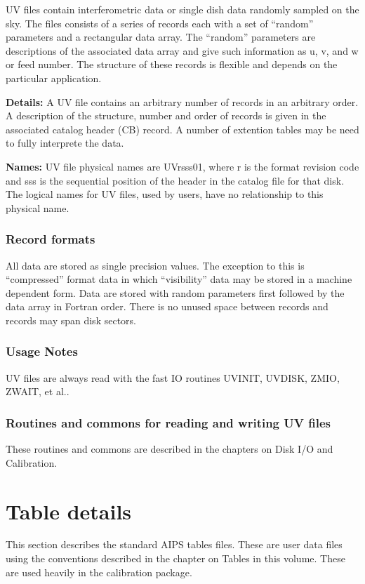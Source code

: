    UV files contain interferometric data or single dish data randomly
sampled on the sky.  The files consists of a series of records each
with a set of ``random'' parameters and a rectangular data array.  The
``random'' parameters are descriptions of the associated data array
and give such information as u, v, and w or feed number.  The
structure of these records is flexible and depends on the particular
application.

{\bf Details:} A UV file contains an arbitrary number of records in an
arbitrary order.  A description of the structure, number and order of
records is given in the associated catalog header (CB) record.  A
number of extention tables may be need to fully interprete the data.

{\bf Names:} UV file physical names are UVrsss01, where r is the
format revision code and sss is the sequential position of the header
in the catalog file for that disk.  The logical names for UV files,
used by users, have no relationship to this physical name.


\subsubsection{Record formats}

   All data are stored as single precision values.  The exception to
this is ``compressed'' format data in which ``visibility'' data may be
stored in a machine dependent form.  Data are stored with random
parameters first followed by the data array in Fortran order.  There
is no unused space between records and records may span disk sectors.

\subsubsection{Usage Notes}

     UV files are always read with the fast IO routines
UVINIT, UVDISK, ZMIO,
ZWAIT, et al..


\subsubsection{Routines and commons for reading and writing UV files}

     These routines and commons are described in the chapters on Disk
I/O and Calibration.

\section{Table details }
   This section describes the standard AIPS tables files.  These are
user data files using the conventions described in the chapter on
Tables in this volume.  These are used heavily in the calibration
package.
